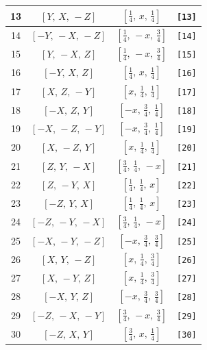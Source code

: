 \documentclass[fleqn,8pt]{jsarticle}
\begin{document}
\begin{longtable}{cccc}
13 & $\left[ Y,\, X,\, - Z \right]$ & $\left[ \frac{1}{4},\, x,\, \frac{1}{4} \right]$ & {\tt [13]} \\ \hline
14 & $\left[ - Y,\, - X,\, - Z \right]$ & $\left[ \frac{1}{4},\, - x,\, \frac{3}{4} \right]$ & {\tt [14]} \\ \hline
15 & $\left[ Y,\, - X,\, Z \right]$ & $\left[ \frac{1}{4},\, - x,\, \frac{3}{4} \right]$ & {\tt [15]} \\ \hline
16 & $\left[ - Y,\, X,\, Z \right]$ & $\left[ \frac{1}{4},\, x,\, \frac{1}{4} \right]$ & {\tt [16]} \\ \hline
17 & $\left[ X,\, Z,\, - Y \right]$ & $\left[ x,\, \frac{1}{4},\, \frac{1}{4} \right]$ & {\tt [17]} \\ \hline
18 & $\left[ - X,\, Z,\, Y \right]$ & $\left[ - x,\, \frac{3}{4},\, \frac{1}{4} \right]$ & {\tt [18]} \\ \hline
19 & $\left[ - X,\, - Z,\, - Y \right]$ & $\left[ - x,\, \frac{3}{4},\, \frac{1}{4} \right]$ & {\tt [19]} \\ \hline
20 & $\left[ X,\, - Z,\, Y \right]$ & $\left[ x,\, \frac{1}{4},\, \frac{1}{4} \right]$ & {\tt [20]} \\ \hline
21 & $\left[ Z,\, Y,\, - X \right]$ & $\left[ \frac{3}{4},\, \frac{1}{4},\, - x \right]$ & {\tt [21]} \\ \hline
22 & $\left[ Z,\, - Y,\, X \right]$ & $\left[ \frac{1}{4},\, \frac{1}{4},\, x \right]$ & {\tt [22]} \\ \hline
23 & $\left[ - Z,\, Y,\, X \right]$ & $\left[ \frac{1}{4},\, \frac{1}{4},\, x \right]$ & {\tt [23]} \\ \hline
24 & $\left[ - Z,\, - Y,\, - X \right]$ & $\left[ \frac{3}{4},\, \frac{1}{4},\, - x \right]$ & {\tt [24]} \\ \hline
25 & $\left[ - X,\, - Y,\, - Z \right]$ & $\left[ - x,\, \frac{3}{4},\, \frac{3}{4} \right]$ & {\tt [25]} \\ \hline
26 & $\left[ X,\, Y,\, - Z \right]$ & $\left[ x,\, \frac{1}{4},\, \frac{3}{4} \right]$ & {\tt [26]} \\ \hline
27 & $\left[ X,\, - Y,\, Z \right]$ & $\left[ x,\, \frac{1}{4},\, \frac{3}{4} \right]$ & {\tt [27]} \\ \hline
28 & $\left[ - X,\, Y,\, Z \right]$ & $\left[ - x,\, \frac{3}{4},\, \frac{3}{4} \right]$ & {\tt [28]} \\ \hline
29 & $\left[ - Z,\, - X,\, - Y \right]$ & $\left[ \frac{3}{4},\, - x,\, \frac{3}{4} \right]$ & {\tt [29]} \\ \hline
30 & $\left[ - Z,\, X,\, Y \right]$ & $\left[ \frac{3}{4},\, x,\, \frac{1}{4} \right]$ & {\tt [30]} \\ \hline

\end{longtable}
\end{document}
